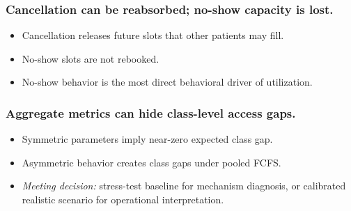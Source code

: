 \documentclass[18pt,aspectratio=169]{beamer}
\begin{document}
\begin{frame}
  \frametitle{Cancellation can be reabsorbed; no-show capacity is lost.}
  \vspace{0.6em}
  \begin{itemize}
    \setlength{\itemsep}{0.9em}
    \item Cancellation releases future slots that other patients may fill.
    \item No-show slots are not rebooked.
    \item No-show behavior is the most direct behavioral driver of utilization.
  \end{itemize}
\end{frame}

\begin{frame}
  \frametitle{Aggregate metrics can hide class-level access gaps.}
  \vspace{0.6em}
  \begin{itemize}
    \setlength{\itemsep}{0.9em}
    \item Symmetric parameters imply near-zero expected class gap.
    \item Asymmetric behavior creates class gaps under pooled FCFS.
    \item \textit{Meeting decision:} stress-test baseline for mechanism
          diagnosis, or calibrated realistic scenario for operational
          interpretation.
  \end{itemize}
\end{frame}
\end{document}

